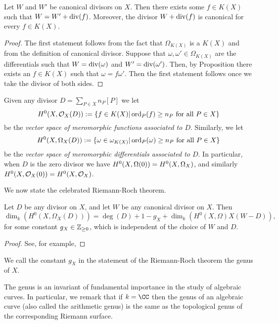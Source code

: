     \begin{thm}
    Let $W$ and $W'$ be canonical divisors on $X$.
    Then there exists some $f \in K(X)$ such that $W = W' + \operatorname{div}(f)$.
    Moreover, the divisor $W + \operatorname{div}(f)$ is canonical for every $f \in K(X)$.
    \end{thm}
    \begin{proof}
    The first statement follows from the fact that $\Omega_{K(X)}$ is a $K(X)$ and from the definition of canonical divisor.
    Suppose that $\omega, \omega' \in \Omega_{K(X)}$ are the differentials such that $W = \operatorname{div}(\omega)$ and $W' = \operatorname{div}(\omega')$.
    Then, by Proposition  there exists an $f \in K(X)$ such that $\omega = f \omega'$.
    Then the first statement follows once we take the divisor of both sides.
    \end{proof}

Given any divisor $D = \sum_{P \in X} n_P[P]$ we let
    \[
    H^0(X,{\cal O}_X(D)) : = \{ f \in K(X) | \operatorname{ord}_P(f) \geq n_P\ \text{for all}\ P \in X\}
    \]
be the \emph{vector space of meromorphic functions associated to $D$}.
Similarly, we let 
    \[
    H^0(X,\Omega_X(D)) :  = \{ \omega \in \omega_{K(X)} | \ord_P(\omega) \geq n_P \ \text{for all} \ P \in X\}
    \]
be the \emph{vector space of meromorphic differentials associated to $D$}.
In particular, when $D$ is the zero divisor we have $H^0(X,\Omega(0)) = {H^0(X,\Omega_X)}$, and similarly $H^0(X,{\cal O}_X(0)) = H^0(X,{\cal O}_X)$.

We now state the celebrated Riemann-Roch theorem.

    \begin{thm}
    Let $D$ be any divisor on $X$, and let $W$ be any canonical divisor on $X$.
    Then
        \[
        \dim_k(H^0(X,\Omega_X(D))) = \deg(D) + 1 - g_X + \dim_k(H^0(X,\Omega)X(W-D)), 
        \]
    for some constant $g_X \in {\mathbb Z}_{\geq 0}$, which is independent of the choice of $W$ and $D$.
    \end{thm}
    \begin{proof}
    See, for example, 
    \end{proof}

    \begin{defn}
    We call the constant $g_X$ in the statement of the Riemann-Roch theorem the genus of $X$.
    \end{defn}

The genus is an invariant of fundamental importance in the study of algebraic curves.
In particular, we remark that if $k = \CC$ then the genus of an algebraic curve (also called the arithmetic genus) is the same as the topological genus of the corresponding Riemann surface.

